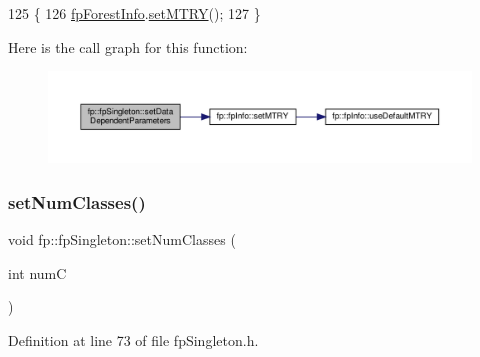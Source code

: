 \begin{DoxyCode}
125                                                     \{
126                 \hyperlink{classfp_1_1fpSingleton_a85965009befa72a749ae498fa5b6ccfa}{fpForestInfo}.\hyperlink{classfp_1_1fpInfo_a6b2a54fb9b3672e7b1bab3474a0ca33f}{setMTRY}();
127             \}
\end{DoxyCode}
Here is the call graph for this function\+:\nopagebreak
\begin{figure}[H]
\begin{center}
\leavevmode
\includegraphics[width=350pt]{classfp_1_1fpSingleton_a3edf17209500e72c76ef816e32666eb2_cgraph}
\end{center}
\end{figure}
\mbox{\label{classfp_1_1fpSingleton_a499e7cef6b463cc24590d05a0d0e6e1c}} 
\subsubsection{\texorpdfstring{set\+Num\+Classes()}{setNumClasses()}}
{\footnotesize\ttfamily void fp\+::fp\+Singleton\+::set\+Num\+Classes (\begin{DoxyParamCaption}\item[{int}]{numC }\end{DoxyParamCaption})\hspace{0.3cm}{\ttfamily [inline]}}



Definition at line 73 of file fp\+Singleton.\+h.


